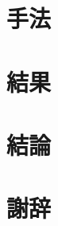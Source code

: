 \documentclass[a4paper,12pt,titlepage,openany]{bxjsbook}
\numberwithin{equation}{section}
\begin{document}
\chapter{手法}
\label{sec:method}


\chapter{結果}


\chapter{結論}


\clearpage
\renewcommand{\appendixname}{付録}
\appendix

%

%

\clearpage

\nocite{*}



\clearpage
\chapter*{謝辞}


\end{document}
